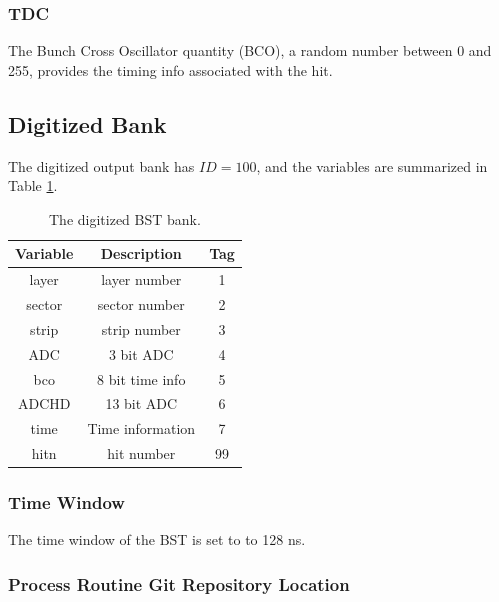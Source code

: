 \subsubsection{TDC}
The Bunch Cross Oscillator quantity (BCO), a random number between 0 and 255,
provides the timing info associated with the hit.

\subsection{Digitized Bank}
The digitized output bank has $ID=100$, and the variables are summarized in Table \ref{tab:bstBank}.

\begin{table}[h]
	\begin{center}
		\begin{tabular}{| c | c | c |}
			\hline \hline
			Variable         & Description  & Tag  \\
			\hline
               layer  &                                      layer number  &    1   \\
              sector  &                                     sector number  &    2   \\
               strip  &                                      strip number  &    3   \\
                 ADC  &                                         3 bit ADC  &    4   \\
                 bco  &                                   8 bit time info  &    5   \\
               ADCHD  &                                        13 bit ADC  &    6   \\
                time  &                                  Time information  &    7   \\
                hitn  &                                        hit number  &   99   \\
			\hline \hline
		\end{tabular}
	\end{center}
	\caption{The digitized BST bank.}\label{tab:bstBank}
\end{table}


\subsubsection{Time Window}
The time window  of the BST is set to to 128 ns.

\subsubsection{Process Routine Git Repository Location}

